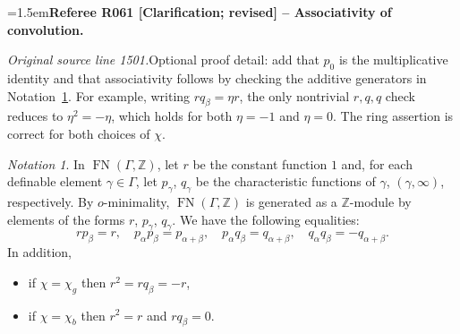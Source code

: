 \documentclass[12pt]{amsart}
\newcommand{\RefereeRemark}[4]{%
  \par\medskip\begingroup\normalfont\small\color{RefereePurple}%
  \emergencystretch=1.5em\noindent\textbf{Referee R#1 [#2] -- #3.}\par\nobreak\noindent #4\par
  \endgroup\medskip
}
\theoremstyle{plain}
\theoremstyle{definition}
\theoremstyle{remark}
\newtheorem{nota}[thm]{Notation}
\numberwithin{equation}{section}
\theoremstyle{plain}
\newcommand{\Z}{\mathds{Z}}
\newcommand{\omin}{$o$\nobreakdash}
\newcommand{\0}{\emptyset}
\DeclareMathOperator{\fn}{FN}
\begin{document}
\RefereeRemark{061}{Clarification; revised}{Associativity of convolution}{%
\textit{Original source line 1501.}\quad Optional proof detail: add that $p_0$ is the multiplicative identity and that associativity follows by checking the additive generators in Notation~\ref{gam:equ:cons}. For example, writing $rq_\beta=\eta r$, the only nontrivial $r,q,q$ check reduces to $\eta^2=-\eta$, which holds for both $\eta=-1$ and $\eta=0$. The ring assertion is correct for both choices of $\chi$.
}

\begin{nota}\label{gam:equ:cons}
In $\fn(\Gamma, \Z)$, let $r$ be the constant function $1$ and, for each definable element $\gamma \in \Gamma$, let $p_{\gamma}$,  $q_{\gamma}$ be the characteristic functions of $\gamma$, $(\gamma, \infty)$, respectively. By \omin-minimality, $\fn(\Gamma, \Z)$ is generated as a $\Z$-module by elements of the forms $r$, $p_\gamma$, $q_\gamma$. We have the following equalities:
\[
r p_\beta   = r, \quad p_\alpha p_\beta = p_{\alpha+ \beta}, \quad p_\alpha q_\beta  = q_{\alpha+ \beta}, \quad q_\alpha q_\beta = - q_{\alpha+ \beta}.
\]
In addition,
\begin{itemize}
  \item if $\chi = \chi_{g}$ then $r^2 = r q_\beta = - r$,
  \item if $\chi = \chi_{b}$ then $r^2 = r$ and $r q_\beta = 0$.
\end{itemize}
\end{nota}
\end{document}
